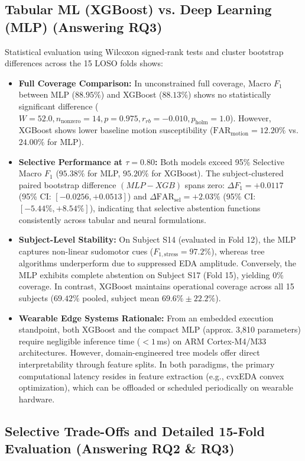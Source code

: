 \documentclass[conference]{IEEEtran}
\begin{document}
\subsection{Tabular ML (XGBoost) vs. Deep Learning (MLP) (Answering RQ3)}
Statistical evaluation using Wilcoxon signed-rank tests and cluster bootstrap differences across the 15 LOSO folds shows:
\begin{itemize}
    \item \textbf{Full Coverage Comparison:} In unconstrained full coverage, Macro $F_1$ between MLP ($88.95\%$) and XGBoost ($88.13\%$) shows no statistically significant difference ($W = 52.0, n_{\text{nonzero}} = 14, p = 0.975, r_{rb} = -0.010, p_{\text{holm}} = 1.0$). However, XGBoost shows lower baseline motion susceptibility ($\text{FAR}_{\text{motion}} = 12.20\%$ vs. $24.00\%$ for MLP).
    \item \textbf{Selective Performance at $\tau = 0.80$:} Both models exceed 95\% Selective Macro $F_1$ ($95.38\%$ for MLP, $95.20\%$ for XGBoost). The subject-clustered paired bootstrap difference $(MLP - XGB)$ spans zero: $\Delta F_1 = +0.0117$ (95\% CI: $[-0.0256, +0.0513]$) and $\Delta \text{FAR}_{\text{sel}} = +2.03\%$ (95\% CI: $[-5.44\%, +8.54\%]$), indicating that selective abstention functions consistently across tabular and neural formulations.
    \item \textbf{Subject-Level Stability:} On Subject S14 (evaluated in Fold 12), the MLP captures non-linear sudomotor cues ($F_{1,\text{stress}} = 97.2\%$), whereas tree algorithms underperform due to suppressed EDA amplitude. Conversely, the MLP exhibits complete abstention on Subject S17 (Fold 15), yielding 0\% coverage. In contrast, XGBoost maintains operational coverage across all 15 subjects ($69.42\%$ pooled, subject mean $69.6\% \pm 22.2\%$).
    \item \textbf{Wearable Edge Systems Rationale:} From an embedded execution standpoint, both XGBoost and the compact MLP (approx. 3,810 parameters) require negligible inference time ($< 1$\,ms) on ARM Cortex-M4/M33 architectures. However, domain-engineered tree models offer direct interpretability through feature splits. In both paradigms, the primary computational latency resides in feature extraction (e.g., cvxEDA convex optimization), which can be offloaded or scheduled periodically on wearable hardware.
\end{itemize}

\subsection{Selective Trade-Offs and Detailed 15-Fold Evaluation (Answering RQ2 \& RQ3)}
\end{document}
